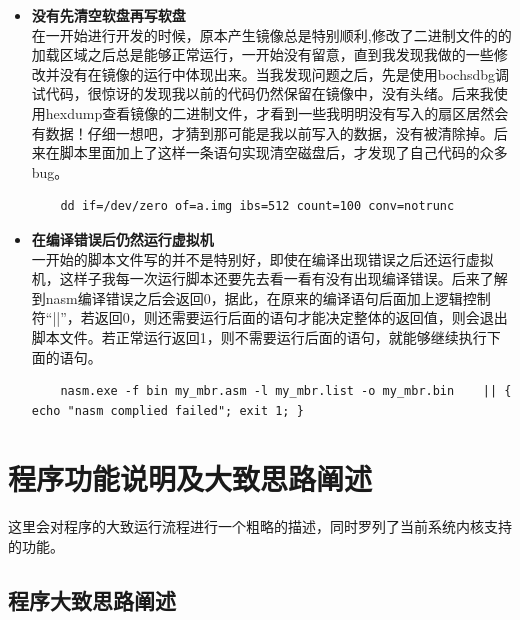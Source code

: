 \documentclass[forprint]{WHUBachelor}
\begin{document}
\begin{itemize}
  \item \textbf{没有先清空软盘再写软盘} \\

  在一开始进行开发的时候，原本产生镜像总是特别顺利,修改了二进制文件的的加载区域之后总是能够正常运行，一开始没有留意，直到我发现我做的一些修改并没有在镜像的运行中体现出来。当我发现问题之后，先是使用bochsdbg调试代码，很惊讶的发现我以前的代码仍然保留在镜像中，没有头绪。后来我使用hexdump查看镜像的二进制文件，才看到一些我明明没有写入的扇区居然会有数据！仔细一想吧，才猜到那可能是我以前写入的数据，没有被清除掉。后来在脚本里面加上了这样一条语句实现清空磁盘后，才发现了自己代码的众多bug。
  \begin{lstlisting}
    dd if=/dev/zero of=a.img ibs=512 count=100 conv=notrunc
  \end{lstlisting}
  \item \textbf{在编译错误后仍然运行虚拟机} \\

  一开始的脚本文件写的并不是特别好，即使在编译出现错误之后还运行虚拟机，这样子我每一次运行脚本还要先去看一看有没有出现编译错误。后来了解到nasm编译错误之后会返回0，据此，在原来的编译语句后面加上逻辑控制符“||”，若返回0，则还需要运行后面的语句才能决定整体的返回值，则会退出脚本文件。若正常运行返回1，则不需要运行后面的语句，就能够继续执行下面的语句。
  \begin{lstlisting}
    nasm.exe -f bin my_mbr.asm -l my_mbr.list -o my_mbr.bin    || { echo "nasm complied failed"; exit 1; }
  \end{lstlisting}
\end{itemize}

\section{程序功能说明及大致思路阐述}

这里会对程序的大致运行流程进行一个粗略的描述，同时罗列了当前系统内核支持的功能。

\subsection{程序大致思路阐述}
\end{document}
